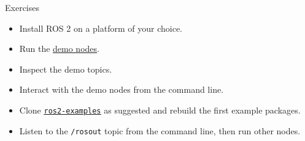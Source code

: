 \begin{frame}{Exercises}
  \justifying
  \begin{itemize}
    \item Install ROS 2 on a platform of your choice.
    \item Run the \href{https://docs.ros.org/en/jazzy/Installation/Ubuntu-Install-Debs.html\#try-some-examples}{\color{blue}\underline{demo nodes}}.
    \item Inspect the demo topics.
    \item Interact with the demo nodes from the command line.
    \item Clone \href{https://github.com/IntelligentSystemsLabUTV/ros2-examples}{\color{blue}\underline{\texttt{ros2-examples}}} as suggested and rebuild the first example packages.
    \item Listen to the \texttt{/rosout} topic from the command line, then run other nodes.
  \end{itemize}
\end{frame}
